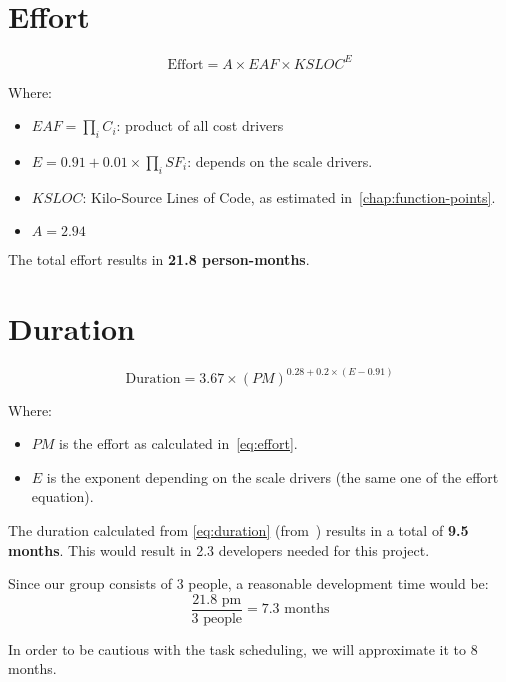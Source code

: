 \section{Effort}
\label{sec:effort}

\begin{equation}
    \textrm{Effort} = A \times EAF \times KSLOC^E
    \label{eq:effort}
\end{equation}

Where:
\begin{itemize}
    \item $EAF = \prod_i C_i$: product of all cost drivers
    \item $E=0.91 + 0.01 \times \prod_{i}SF_i$: depends on the scale drivers.
    \item $KSLOC$: Kilo-Source Lines of Code, as estimated in~\autoref{chap:function-points}.
    \item $A=2.94$
\end{itemize}

The total effort results in \textbf{21.8 person-months}.

\section{Duration}

\begin{equation}
    \textrm{Duration} = 3.67 \times (PM)^{0.28 + 0.2 \times (E-0.91)}
    \label{eq:duration}
\end{equation}

Where:
\begin{itemize}
    \item $PM$ is the effort as calculated in~\autoref{eq:effort}.
    \item $E$ is the exponent depending on the scale drivers (the same one of the effort equation).
\end{itemize}

The duration calculated from \autoref{eq:duration} (from~\cite{cocomo-manual}) results in a total of \textbf{9.5 months}.
This would result in 2.3 developers needed for this project.

Since our group consists of 3 people, a reasonable development time would be:
\[
    \frac{21.8\textrm{ pm}}{3 \textrm{ people}}=7.3\textrm{ months}
\]

In order to be cautious with the task scheduling, we will approximate it to 8 months.